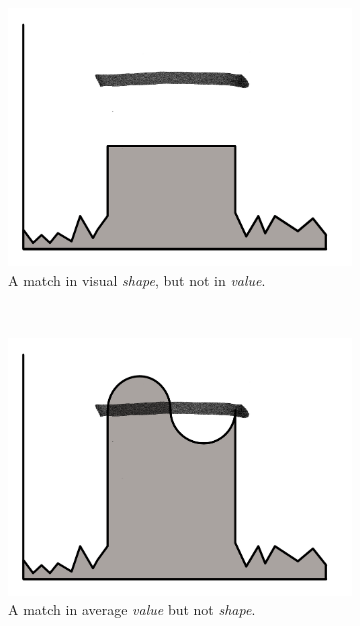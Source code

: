 {\begin{figure}
	
	\begin{subfigure}[t]{.25\textwidth}
		\includegraphics[width=\textwidth]{./figures/amplitude}
		\caption{A match in visual \emph{shape}, but not in \emph{value}.}
		\label{fig:pattern}
	\end{subfigure}
	~
	\begin{subfigure}[t]{.25\textwidth}
		\includegraphics[width=\textwidth]{./figures/average}
		\caption{A match in average \emph{value} but not \emph{shape}.}
		\label{fig:value}
	\end{subfigure}
	~
	\begin{subfigure}[t]{.25\textwidth}

\end{subfigure}
\end{figure}}
